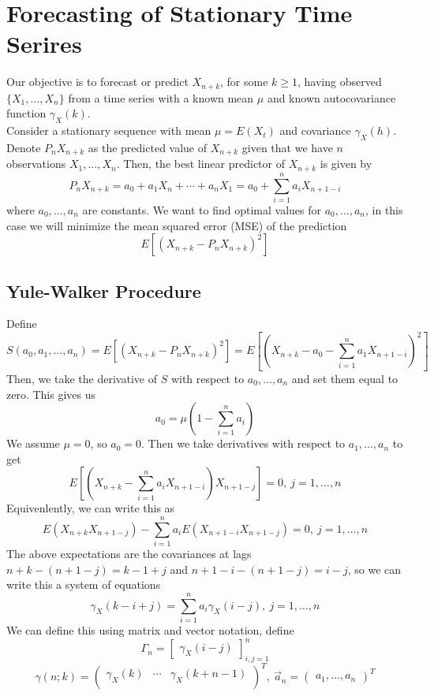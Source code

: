 \chapter{Forecasting of Stationary Time Serires}

Our objective is to forecast or predict $X_{n+k}$, for some $k\geq1$, having observed $\{X_1,\ldots,X_n\}$ from a time series with a known mean $\mu$ and known autocovariance function $\gamma_X(k)$.\\

Consider a stationary sequence with mean $\mu = E(X_t)$ and covariance $\gamma_X(h)$. Denote $P_nX_{n+k}$ as the predicted value of $X_{n+k}$ given that we have $n$ observations $X_1,\ldots,X_n$. Then, the best linear predictor of $X_{n+k}$ is given by
\[P_nX_{n+k} = a_0 + a_1X_n + \cdots + a_nX_1 = a_0 + \sum_{i=1}^n a_iX_{n+1-i}\]
where $a_0,\ldots,a_n$ are constants. We want to find optimal values for $a_0,\ldots,a_n$, in this case we will minimize the mean squared error (MSE) of the prediction
\[E\left[(X_{n+k} - P_nX_{n+k})^2\right]\]

\section{Yule-Walker Procedure}

Define 
\[S(a_0,a_1, \ldots, a_n) = E\left[(X_{n+k}-P_nX_{n+k})^2\right] = E\left[\left(X_{n+k} - a_0 - \sum_{i=1}^n a_1X_{n+1-i}\right)^2\right]\]
Then, we take the derivative of $S$ with respect to $a_0,\ldots,a_n$ and set them equal to zero. This gives us 
\[a_0 = \mu\left(1-\sum_{i=1}^n a_i\right)\]
We assume $\mu = 0$, so $a_0 = 0$. Then we take derivatives with respect to $a_1,\ldots,a_n$ to get 
\[E\left[\left(X_{n+k}-\sum_{i=1}^na_iX_{n+1-i}\right)X_{n+1-j}\right] = 0, \ j=1,\ldots,n\]
Equivenlently, we can write this as
\[E(X_{n+k}X_{n+1-j}) - \sum_{i=1}^n a_iE(X_{n+1-i}X_{n+1-j}) = 0, \ j = 1,\ldots, n\]
The above expectations are the covariances at lags $n+k - (n+1-j) = k-1+j$ and $n+1-i-(n+1-j) = i-j$, so we can write this a system of equations
\[\gamma_X(k-i+j) = \sum_{i=1}^na_i\gamma_X(i-j), \ j = 1,\ldots, n\]
We can define this using matrix and vector notation, define 
\[\Gamma_n = \begin{bmatrix}\gamma_X(i-j)\end{bmatrix}^n_{i,j=1}\]
\[\gamma(n;k) = \begin{pmatrix}
 \gamma_X(k) & \cdots & \gamma_X(k+n-1) \\
\end{pmatrix}^T, \ \vec{a}_n = \begin{pmatrix}
    a_1, \ldots, a_n
\end{pmatrix}^T\]

